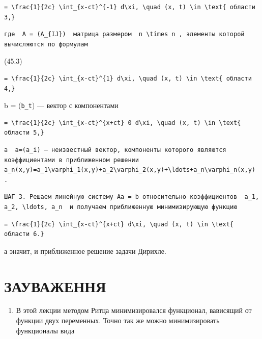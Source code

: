 \documentclass[
  ukrainian,
]{article}
\providecommand{\tightlist}{%
  \setlength{\itemsep}{0pt}\setlength{\parskip}{0pt}}
\begin{document}
\begin{verbatim}
= \frac{1}{2c} \int_{x-ct}^{-1} d\xi, \quad (x, t) \in \text{ области 3,}
\end{verbatim}

\begin{verbatim}
где  A = (A_{IJ})  матрица размером  n \times n , элементы которой вычисляются по формулам
\end{verbatim}

(45.3)

\begin{verbatim}
= \frac{1}{2c} \int_{x-ct}^{1} d\xi, \quad (x, t) \in \text{ области 4,}
\end{verbatim}

b = (\texttt{b\_t}) --- вектор с компонентами

\begin{verbatim}
= \frac{1}{2c} \int_{x-ct}^{x+ct} 0 d\xi, \quad (x, t) \in \text{ области 5,}
\end{verbatim}

\begin{verbatim}
а  a=(a_i) — неизвестный вектор, компоненты которого являются коэффициентами в приближенном решении  a_n(x,y)=a_1\varphi_1(x,y)+a_2\varphi_2(x,y)+\ldots+a_n\varphi_n(x,y) .
\end{verbatim}

\begin{verbatim}
ШАГ 3. Решаем линейную систему Aa = b относительно коэффициентов  a_1, a_2, \ldots, a_n  и получаем приближенную минимизирующую функцию
\end{verbatim}

\begin{verbatim}
= \frac{1}{2c} \int_{x-ct}^{x+ct} d\xi, \quad (x, t) \in \text{ области 6.}
\end{verbatim}

а эначит, и приближенное решение задачи Дирихле.

\section{ЗАУВАЖЕННЯ}\label{ux437ux430ux443ux432ux430ux436ux435ux43dux43dux44f}

\begin{enumerate}
\def\labelenumi{\arabic{enumi}.}
\tightlist
\item
  В этой лекции методом Ритца минимизировался функционал, вависящий от
  функции двух переменных. Точно так же можно минимизировать функционалы
  вида
\end{enumerate}
\end{document}
